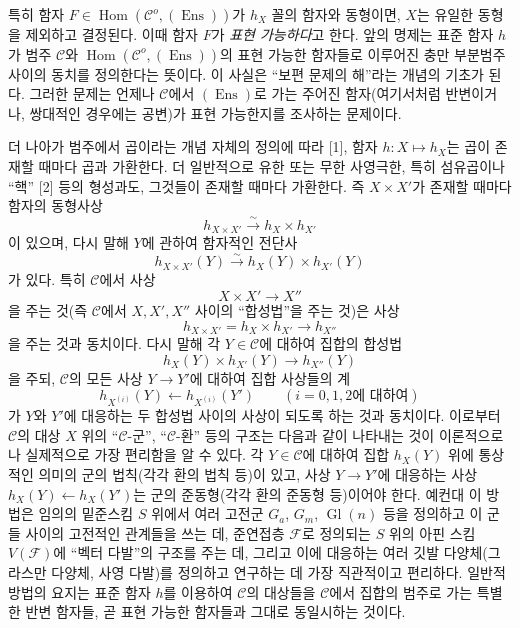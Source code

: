 \documentclass[11pt,twoside,openany]{book}
\numberwithin{equation}{section}
\newcommand{\sourceunit}{front}
\newcommand{\src}[1]{%
  \phantomsection\hypertarget{src:\sourceunit:#1}{}%
  \marginpar{\raggedleft\footnotesize\sffamily #1}%
}
\theoremstyle{plain}
\theoremstyle{definition}
\theoremstyle{remark}
\begin{document}
특히 함자 $F\in\operatorname{Hom}(\mathcal C^o,(\operatorname{Ens}))$가
$h_X$ 꼴의 함자와 동형이면, $X$는 유일한 동형을 제외하고 결정된다.
이때 함자 $F$가 \emph{표현 가능하다}고 한다. 앞의 명제는 표준 함자 $h$가
범주 $\mathcal C$와
$\operatorname{Hom}(\mathcal C^o,(\operatorname{Ens}))$의 표현 가능한
함자들로 이루어진 충만 부분범주 사이의 동치를 정의한다는 뜻이다. 이
사실은 ``보편 문제의 해''라는 개념의 기초가 된다. 그러한 문제는 언제나
$\mathcal C$에서 $(\operatorname{Ens})$로 가는 주어진 함자(여기서처럼
반변이거나, 쌍대적인 경우에는 공변)가 표현 가능한지를 조사하는 문제이다.

\src{370}
더 나아가 범주에서 곱이라는 개념 자체의 정의에 따라 [1], 함자
$h:X\longmapsto h_X$는 곱이 존재할 때마다 곱과 가환한다. 더 일반적으로
유한 또는 무한 사영극한, 특히 섬유곱이나 ``핵'' [2] 등의 형성과도,
그것들이 존재할 때마다 가환한다. 즉 $X\times X'$가 존재할 때마다
함자의 동형사상
\[
  h_{X\times X'}\xrightarrow{\sim}h_X\times h_{X'}
\]
이 있으며, 다시 말해 $Y$에 관하여 함자적인 전단사
\[
  h_{X\times X'}(Y)\xrightarrow{\sim}h_X(Y)\times h_{X'}(Y)
\]
가 있다. 특히 $\mathcal C$에서 사상
\[
  X\times X'\longrightarrow X''
\]
을 주는 것(즉 $\mathcal C$에서 $X,X',X''$ 사이의 ``합성법''을 주는 것)은
사상
\[
  h_{X\times X'}=h_X\times h_{X'}\longrightarrow h_{X''}
\]
을 주는 것과 동치이다. 다시 말해 각 $Y\in\mathcal C$에 대하여 집합의
합성법
\[
  h_X(Y)\times h_{X'}(Y)\longrightarrow h_{X''}(Y)
\]
을 주되, $\mathcal C$의 모든 사상 $Y\longrightarrow Y'$에 대하여 집합
사상들의 계
\[
  h_{X^{(i)}}(Y)\longleftarrow h_{X^{(i)}}(Y')
  \qquad(\text{$i=0,1,2$에 대하여})
\]
가 $Y$와 $Y'$에 대응하는 두 합성법 사이의 사상이 되도록 하는 것과
동치이다. 이로부터 $\mathcal C$의 대상 $X$ 위의 ``$\mathcal C$-군'',
``$\mathcal C$-환'' 등의 구조는 다음과 같이 나타내는 것이 이론적으로나
실제적으로 가장 편리함을 알 수 있다. 각 $Y\in\mathcal C$에 대하여 집합
$h_X(Y)$ 위에 통상적인 의미의 군의 법칙(각각 환의 법칙 등)이 있고,
사상 $Y\longrightarrow Y'$에 대응하는 사상
$h_X(Y)\longleftarrow h_X(Y')$는 군의 준동형(각각 환의 준동형 등)이어야
한다. 예컨대 이 방법은 임의의 밑준스킴 $S$ 위에서 여러 고전군
$G_a$, $G_m$, $\operatorname{Gl}(n)$ 등을 정의하고 이 군들 사이의
고전적인 관계들을 쓰는 데, 준연접층 $\mathcal F$로 정의되는 $S$ 위의
아핀 스킴 $V(\mathcal F)$에 ``벡터 다발''의 구조를 주는 데, 그리고
이에 대응하는 여러 깃발 다양체(그라스만 다양체, 사영 다발)를 정의하고
연구하는 데 가장 직관적이고 편리하다. 일반적 방법의 요지는 표준 함자
$h$를 이용하여 $\mathcal C$의 대상들을 $\mathcal C$에서 집합의 범주로
가는 특별한 반변 함자들, 곧 표현 가능한 함자들과 그대로 동일시하는
것이다.
\end{document}
